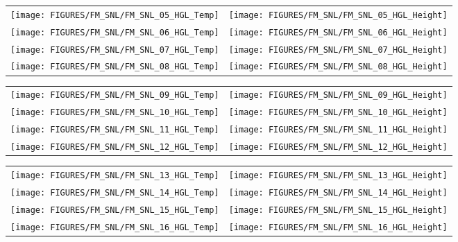 \begin{figure}[p]
\begin{tabular*}{\textwidth}{l@{\extracolsep{\fill}}r}
\texttt{[image: FIGURES/FM\_SNL/FM\_SNL\_05\_HGL\_Temp]} &
\texttt{[image: FIGURES/FM\_SNL/FM\_SNL\_05\_HGL\_Height]} \\
\texttt{[image: FIGURES/FM\_SNL/FM\_SNL\_06\_HGL\_Temp]} &
\texttt{[image: FIGURES/FM\_SNL/FM\_SNL\_06\_HGL\_Height]} \\
\texttt{[image: FIGURES/FM\_SNL/FM\_SNL\_07\_HGL\_Temp]} &
\texttt{[image: FIGURES/FM\_SNL/FM\_SNL\_07\_HGL\_Height]} \\
\texttt{[image: FIGURES/FM\_SNL/FM\_SNL\_08\_HGL\_Temp]} &
\texttt{[image: FIGURES/FM\_SNL/FM\_SNL\_08\_HGL\_Height]} \\
\end{tabular*}
\end{figure}

\newpage

\begin{figure}[p]
\begin{tabular*}{\textwidth}{l@{\extracolsep{\fill}}r}
\texttt{[image: FIGURES/FM\_SNL/FM\_SNL\_09\_HGL\_Temp]} &
\texttt{[image: FIGURES/FM\_SNL/FM\_SNL\_09\_HGL\_Height]} \\
\texttt{[image: FIGURES/FM\_SNL/FM\_SNL\_10\_HGL\_Temp]} &
\texttt{[image: FIGURES/FM\_SNL/FM\_SNL\_10\_HGL\_Height]} \\
\texttt{[image: FIGURES/FM\_SNL/FM\_SNL\_11\_HGL\_Temp]} &
\texttt{[image: FIGURES/FM\_SNL/FM\_SNL\_11\_HGL\_Height]} \\
\texttt{[image: FIGURES/FM\_SNL/FM\_SNL\_12\_HGL\_Temp]} &
\texttt{[image: FIGURES/FM\_SNL/FM\_SNL\_12\_HGL\_Height]} \\
\end{tabular*}
\end{figure}

\newpage

\begin{figure}[p]
\begin{tabular*}{\textwidth}{l@{\extracolsep{\fill}}r}
\texttt{[image: FIGURES/FM\_SNL/FM\_SNL\_13\_HGL\_Temp]} &
\texttt{[image: FIGURES/FM\_SNL/FM\_SNL\_13\_HGL\_Height]} \\
\texttt{[image: FIGURES/FM\_SNL/FM\_SNL\_14\_HGL\_Temp]} &
\texttt{[image: FIGURES/FM\_SNL/FM\_SNL\_14\_HGL\_Height]} \\
\texttt{[image: FIGURES/FM\_SNL/FM\_SNL\_15\_HGL\_Temp]} &
\texttt{[image: FIGURES/FM\_SNL/FM\_SNL\_15\_HGL\_Height]} \\
\texttt{[image: FIGURES/FM\_SNL/FM\_SNL\_16\_HGL\_Temp]} &
\texttt{[image: FIGURES/FM\_SNL/FM\_SNL\_16\_HGL\_Height]} \\
\end{tabular*}
\end{figure}

